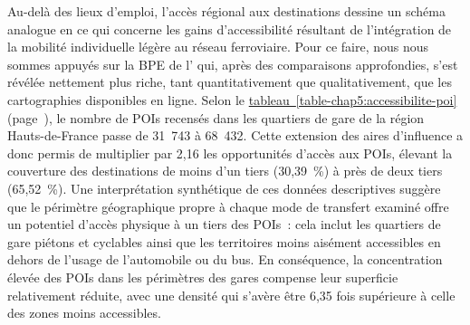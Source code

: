 \begin{refsegment}
Au-delà des lieux d'emploi, l'accès régional aux destinations dessine un schéma analogue en ce qui concerne les gains d'accessibilité résultant de l'intégration de la mobilité individuelle légère au réseau ferroviaire. Pour ce faire, nous nous sommes appuyés sur la \acrfull{BPE} de l'\textcolor{blue}{\textcite{insee_base_2021}} qui, après des comparaisons approfondies, s'est révélée nettement plus riche, tant quantitativement que qualitativement, que les cartographies disponibles en ligne. Selon le \hyperref[table-chap5:accessibilite-poi]{tableau~\ref{table-chap5:accessibilite-poi}} (page~\pageref{table-chap5:accessibilite-poi}), le nombre de \acrshort{POIs} recensés dans les quartiers de gare de la région Hauts-de-France passe de 31~743 à 68~432. Cette extension des aires d'influence a donc permis de multiplier par 2,16 les opportunités d'accès aux \acrshort{POIs}, élevant la couverture des destinations de moins d'un tiers (30,39~\%) à près de deux tiers (65,52~\%). Une interprétation synthétique de ces données descriptives suggère que le périmètre géographique propre à chaque mode de transfert examiné offre un potentiel d'accès physique à un tiers des \acrshort{POIs}~: cela inclut les quartiers de gare piétons et cyclables ainsi que les territoires moins aisément accessibles en dehors de l'usage de l'automobile ou du bus. En conséquence, la concentration élevée des \acrshort{POIs} dans les périmètres des gares compense leur superficie relativement réduite, avec une densité qui s'avère être 6,35 fois supérieure à celle des zones moins accessibles.%



\end{refsegment}

